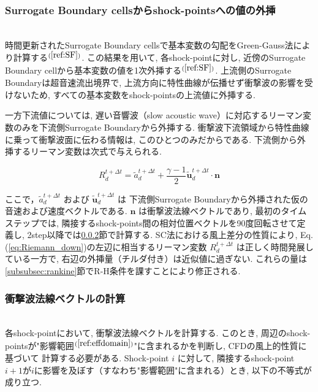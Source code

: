 \documentclass[a4j]{jarticle}
\begin{document}
\subsubsection{Surrogate Boundary cellsからshock-pointsへの値の外挿} \label{subsubsec:extrapolate}
\mbox{}\\[-3.0ex] 

時間更新されたSurrogate Boundary cellsで基本変数の勾配をGreen-Gauss法により計算する$^{(\ref{ref:SF})}$.
この結果を用いて, 各shock-pointに対し, 近傍のSurrogate Boundary cellから基本変数の値を1次外挿する$^{(\ref{ref:SF})}$.
上流側のSurrogate Boundaryは超音速流出境界で, 上流方向に特性曲線が伝播せず衝撃波の影響を受けないため, 
すべての基本変数をshock-pointsの上流値に外挿する.

一方下流値については, 遅い音響波（slow acoustic wave）に対応するリーマン変数のみを下流側Surrogate Boundaryから外挿する.
衝撃波下流領域から特性曲線に乗って衝撃波面に伝わる情報は, このひとつのみだからである.
下流側から外挿するリーマン変数は次式で与えられる.

\begin{equation}
    R_d^{t+\Delta t} = \tilde{a}_d^{t+\Delta t} + \frac{\gamma - 1}{2}\tilde{\mathbf{u}}_d^{t+\Delta t} \cdot \mathbf{n}
    \label{eq:Riemann_down}
\end{equation}

ここで，$\tilde{a}_d^{t+\Delta t}$ および $\tilde{\mathbf{u}}_d^{t+\Delta t}$ は
下流側Surrogate Boundaryから外挿された仮の音速および速度ベクトルである.
$\mathbf{n}$ は衝撃波法線ベクトルであり, 
最初のタイムステップでは, 隣接するshock-points間の相対位置ベクトルを90度回転させて定義し, 
2step以降では\ref{subsubsec:normal}節で計算する.
SC法における風上差分の性質により,
Eq.(\ref{eq:Riemann_down})の左辺に相当するリーマン変数 $R_d^{t+\Delta t}$ は正しく時間発展している一方で,
右辺の外挿量（チルダ付き）は近似値に過ぎない.
これらの量は\ref{subsubsec:rankine}節でR-H条件を課すことにより修正される.

\subsubsection{衝撃波法線ベクトルの計算} \label{subsubsec:normal}
\mbox{}\\[-3.0ex] 

各shock-pointにおいて, 衝撃波法線ベクトルを計算する. このとき, 周辺のshock-pointsが"影響範囲$^{(\ref{ref:effdomain})}$"に含まれるかを判断し, CFDの風上的性質に基づいて
計算する必要がある.
Shock-point $i$ に対して, 隣接するshock-point $i+1$が$i$に影響を及ぼす（すなわち"影響範囲"に含まれる）とき,
以下の不等式が成り立つ.
\end{document}
